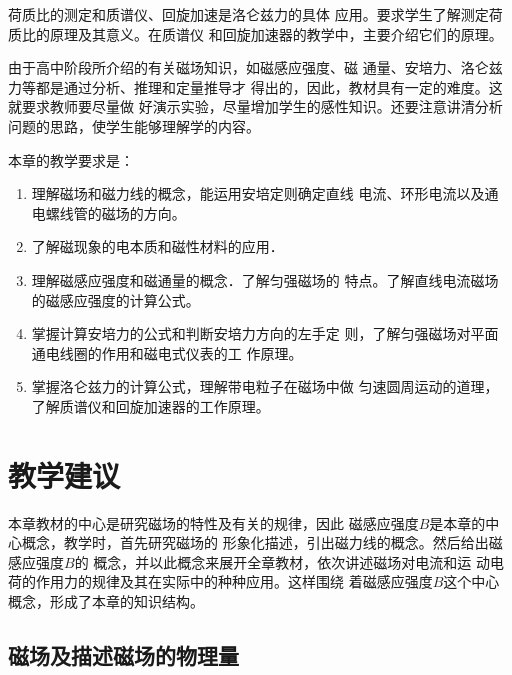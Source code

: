 荷质比的测定和质谱仪、回旋加速是洛仑兹力的具体
应用。要求学生了解测定荷质比的原理及其意义。在质谱仪
和回旋加速器的教学中，主要介绍它们的原理。

由于高中阶段所介绍的有关磁场知识，如磁感应强度、磁
通量、安培力、洛仑兹力等都是通过分析、推理和定量推导才
得出的，因此，教材具有一定的难度。这就要求教师要尽量做
好演示实验，尽量增加学生的感性知识。还要注意讲清分析
问题的思路，使学生能够理解学的内容。

本章的教学要求是：
\begin{enumerate}
\item 理解磁场和磁力线的概念，能运用安培定则确定直线
电流、环形电流以及通电螺线管的磁场的方向。
\item 了解磁现象的电本质和磁性材料的应用．
\item 理解磁感应强度和磁通量的概念．了解匀强磁场的
特点。了解直线电流磁场的磁感应强度的计算公式。
\item 掌握计算安培力的公式和判断安培力方向的左手定
则，了解匀强磁场对平面通电线圈的作用和磁电式仪表的工
作原理。
\item 掌握洛仑兹力的计算公式，理解带电粒子在磁场中做
匀速圆周运动的道理，了解质谱仪和回旋加速器的工作原理。
\end{enumerate}

\section{教学建议}
本章教材的中心是研究磁场的特性及有关的规律，因此
磁感应强度$B$是本章的中心概念，教学时，首先研究磁场的
形象化描述，引出磁力线的概念。然后给出磁感应强度$B$的
概念，并以此概念来展开全章教材，依次讲述磁场对电流和运
动电荷的作用力的规律及其在实际中的种种应用。这样围绕
着磁感应强度$B$这个中心概念，形成了本章的知识结构。

\subsection{磁场及描述磁场的物理量}

